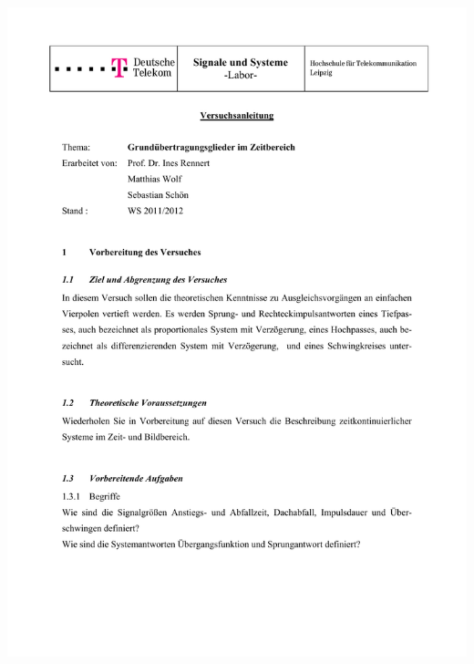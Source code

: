 \includegraphics[width=1.0\textwidth]{Bilder/Grundubertragungsglieder im Zeitbereich (verschoben)}\newpage
